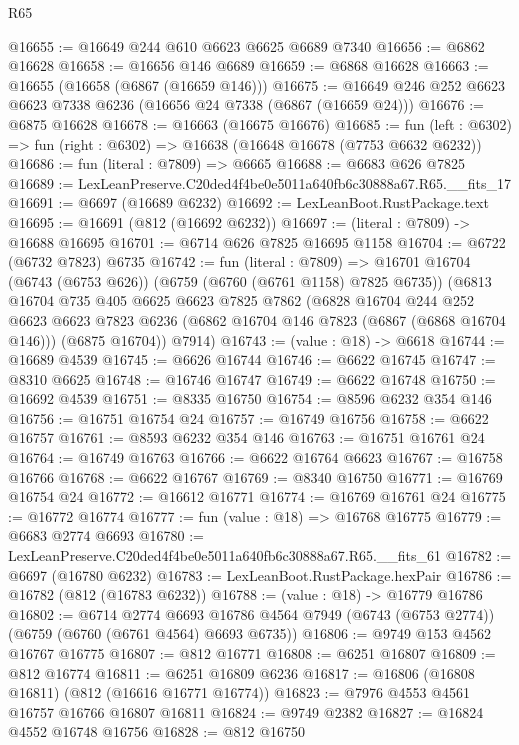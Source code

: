 \begin{lexlean}{R65}
\begin{coremodule}
{@16655 := @16649 @244 @610 @6623 @6625 @6689 @7340
@16656 := @6862 @16628
@16658 := @16656 @146 @6689
@16659 := @6868 @16628
@16663 := @16655 (@16658 (@6867 (@16659 @146)))
@16675 := @16649 @246 @252 @6623 @6623 @7338 @6236 (@16656 @24 @7338 (@6867 (@16659 @24)))
@16676 := @6875 @16628
@16678 := @16663 (@16675 @16676)
@16685 := fun (left : @6302) => fun (right : @6302) => @16638 (@16648 @16678 (@7753 @6632 @6232))
@16686 := fun (literal : @7809) => @6665
@16688 := @6683 @626 @7825
@16689 := LexLeanPreserve.C20ded4f4be0e5011a640fb6c30888a67.R65.__fits_17
@16691 := @6697 (@16689 @6232)
@16692 := LexLeanBoot.RustPackage.text
@16695 := @16691 (@812 (@16692 @6232))
@16697 := (literal : @7809) -> @16688 @16695
@16701 := @6714 @626 @7825 @16695 @1158
@16704 := @6722 (@6732 @7823) @6735
@16742 := fun (literal : @7809) =>
  @16701
    @16704
    (@6743 (@6753 @626))
    (@6759 (@6760 (@6761 @1158) @7825 @6735))
    (@6813
      @16704
      @735
      @405
      @6625
      @6623
      @7825
      @7862
      (@6828
        @16704
        @244
        @252
        @6623
        @6623
        @7823
        @6236
        (@6862 @16704 @146 @7823 (@6867 (@6868 @16704 @146)))
        (@6875 @16704))
      @7914)
@16743 := (value : @18) -> @6618
@16744 := @16689 @4539
@16745 := @6626 @16744
@16746 := @6622 @16745
@16747 := @8310 @6625
@16748 := @16746 @16747
@16749 := @6622 @16748
@16750 := @16692 @4539
@16751 := @8335 @16750
@16754 := @8596 @6232 @354 @146
@16756 := @16751 @16754 @24
@16757 := @16749 @16756
@16758 := @6622 @16757
@16761 := @8593 @6232 @354 @146
@16763 := @16751 @16761 @24
@16764 := @16749 @16763
@16766 := @6622 @16764 @6623
@16767 := @16758 @16766
@16768 := @6622 @16767
@16769 := @8340 @16750
@16771 := @16769 @16754 @24
@16772 := @16612 @16771
@16774 := @16769 @16761 @24
@16775 := @16772 @16774
@16777 := fun (value : @18) => @16768 @16775
@16779 := @6683 @2774 @6693
@16780 := LexLeanPreserve.C20ded4f4be0e5011a640fb6c30888a67.R65.__fits_61
@16782 := @6697 (@16780 @6232)
@16783 := LexLeanBoot.RustPackage.hexPair
@16786 := @16782 (@812 (@16783 @6232))
@16788 := (value : @18) -> @16779 @16786
@16802 := @6714
    @2774
    @6693
    @16786
    @4564
    @7949
    (@6743 (@6753 @2774))
    (@6759 (@6760 (@6761 @4564) @6693 @6735))
@16806 := @9749 @153 @4562 @16767 @16775
@16807 := @812 @16771
@16808 := @6251 @16807
@16809 := @812 @16774
@16811 := @6251 @16809 @6236
@16817 := @16806 (@16808 @16811) (@812 (@16616 @16771 @16774))
@16823 := @7976 @4553 @4561 @16757 @16766 @16807 @16811
@16824 := @9749 @2382
@16827 := @16824 @4552 @16748 @16756
@16828 := @812 @16750
}
\end{coremodule}
\end{lexlean}
